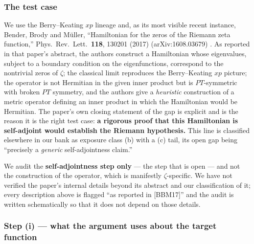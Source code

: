 \documentclass[11pt]{amsart}
\theoremstyle{remark}
\begin{document}
\subsubsection{The test case}

We use the Berry--Keating $xp$ lineage and, as its most visible recent
instance, Bender, Brody and M\"uller, ``Hamiltonian for the zeros of the
Riemann zeta function,'' Phys.\ Rev.\ Lett.\ \textbf{118}, 130201 (2017)
(arXiv:1608.03679) \cite{BBM2017}. As reported in that paper's abstract,
the authors construct a Hamiltonian whose eigenvalues, subject to a
boundary condition on the eigenfunctions, correspond to the nontrivial
zeros of $\zeta$; the classical limit reproduces the Berry--Keating $xp$
picture; the operator is not Hermitian in the given inner product but is
$PT$-symmetric with broken $PT$ symmetry, and the authors give a
\emph{heuristic} construction of a metric operator defining an inner
product in which the Hamiltonian would be Hermitian. The paper's own
closing statement of the gap is explicit and is the reason it is the
right test case: \textbf{a rigorous proof that this Hamiltonian is
self-adjoint would establish the Riemann hypothesis.} This line is
classified elsewhere in our bank as exposure class (b) with a (c) tail,
its open gap being ``precisely a \emph{generic} self-adjointness claim.''

We audit the \textbf{self-adjointness step only} --- the step that is
open --- and not the construction of the operator, which is manifestly
$\zeta$-specific. We have not verified the paper's internal details
beyond its abstract and our classification of it; every description
above is flagged ``as reported in [BBM17]'' and the audit is written
schematically so that it does not depend on those details.

\subsubsection{Step (i) --- what the argument uses about the target function}
\end{document}
